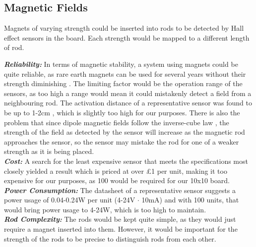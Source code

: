 
\subsection{Magnetic Fields}
\label{magnets}

Magnets of varying strength could be inserted into rods to be detected by Hall effect sensors in the board. Each strength would be mapped to a different length of rod. \\

{
\setlength{\parindent}{0pt} 

\textbf{\textit{Reliability:}} In terms of magnetic stability, a system using magnets could be quite reliable, as rare earth magnets can be used for several years without their strength diminishing \cite{Permanen88:online}. The limiting factor would be the operation range of the sensors, as too high a range would mean it could mistakenly detect a field from a neighbouring rod. The activation distance of a representative sensor was found to be up to 1-2cm \cite{47017pdf16:online}, which is slightly too high for our purposes. There is also the problem that since dipole magnetic fields follow the inverse-cube law \cite{Theinver11:online}, the strength of the field as detected by the sensor will increase as the magnetic rod approaches the sensor, so the sensor may mistake the rod for one of a weaker strength as it is being placed. \\

\textbf{\textit{Cost:}} A search for the least expensive sensor that meets the specifications most closely yielded a result \cite{A1318LUA39:online} which is priced at over £1 per unit, making it too expensive for our purposes, as 100 would be required for our 10x10 board. \\

\textbf{\textit{Power Consumption:}} The datasheet of a representative sensor \cite{47017pdf16:online} suggests a power usage of 0.04-0.24W per unit (4-24V $\cdot$ 10mA) and with 100 units, that would bring power usage to 4-24W, which is too high to maintain.   \\

\textbf{\textit{Rod Complexity:}} The rods would be kept quite simple, as they would just require a magnet inserted into them. However, it would be important for the strength of the rods to be precise to distinguish rods from each other.\\
}



